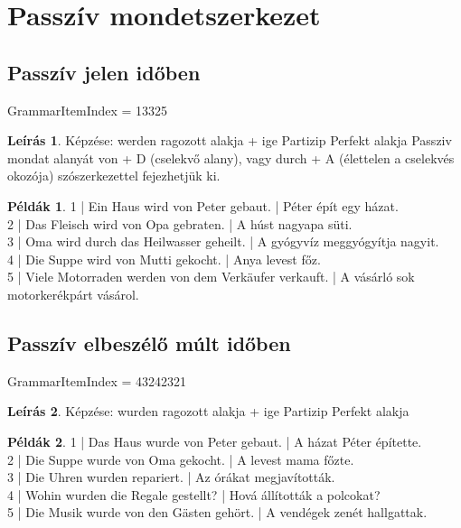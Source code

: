 \documentclass{article}
\theoremstyle{definition}
\newtheorem*{exmp}{Példák}
\newtheorem*{desc}{Leírás}
\begin{document}
\section{Passzív mondetszerkezet}

\subsection{Passzív jelen időben}

GrammarItemIndex = 13325

\begin{desc}
Képzése: werden ragozott alakja + ige Partizip Perfekt alakja
Passziv mondat alanyát von + D (cselekvő alany), vagy durch + A (élettelen a cselekvés okozója) szószerkezettel fejezhetjük ki.
\end{desc}

\begin{exmp}
1 | Ein Haus wird von Peter gebaut. | Péter épít egy házat.\\
2 | Das Fleisch wird von Opa gebraten. | A húst nagyapa süti.\\
3 | Oma wird durch das Heilwasser geheilt. | A gyógyvíz meggyógyítja nagyit.\\
4 | Die Suppe wird von Mutti gekocht. | Anya levest főz.\\
5 | Viele Motorraden werden von dem Verkäufer verkauft. | A vásárló sok motorkerékpárt vásárol.\\
\end{exmp}

\subsection{Passzív elbeszélő múlt időben}

GrammarItemIndex = 43242321

\begin{desc}
Képzése: wurden ragozott alakja + ige Partizip Perfekt alakja
\end{desc}

\begin{exmp}
1 | Das Haus wurde von Peter gebaut. | A házat Péter építette.\\
2 | Die Suppe wurde von Oma gekocht. | A levest mama főzte.\\
3 | Die Uhren wurden repariert. | Az órákat megjavították.\\
4 | Wohin wurden die Regale gestellt? | Hová állították a polcokat?\\
5 | Die Musik wurde von den Gästen gehört. | A vendégek zenét hallgattak.\\
\end{exmp}
\end{document}
